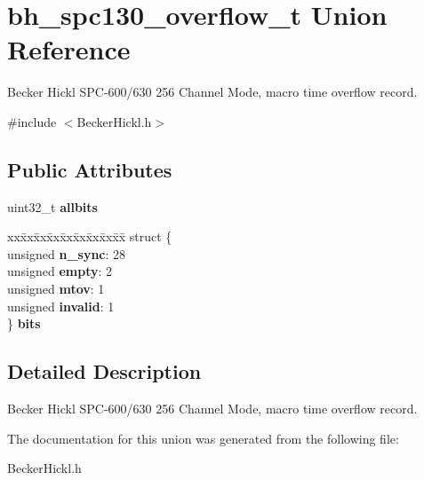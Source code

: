 \hypertarget{unionbh__spc130__overflow__t}{}\section{bh\+\_\+spc130\+\_\+overflow\+\_\+t Union Reference}
\label{unionbh__spc130__overflow__t}


Becker Hickl S\+P\+C-\/600/630 256 Channel Mode, macro time overflow record.  




{\ttfamily \#include $<$Becker\+Hickl.\+h$>$}

\subsection*{Public Attributes}
\begin{DoxyCompactItemize}
\item 
\mbox{\label{unionbh__spc130__overflow__t_aae580fff8ae8ac3f2bfb989756e66bf2}} 
uint32\+\_\+t {\bfseries allbits}
\item 
\mbox{\label{unionbh__spc130__overflow__t_a0a5c4c5c095a4a54ad15ed6bf6ca1eb1}} 
\begin{tabbing}
xx\=xx\=xx\=xx\=xx\=xx\=xx\=xx\=xx\=\kill
struct \{\\
\>unsigned {\bfseries n\_sync}: 28\\
\>unsigned {\bfseries empty}: 2\\
\>unsigned {\bfseries mtov}: 1\\
\>unsigned {\bfseries invalid}: 1\\
\} {\bfseries bits}\\

\end{tabbing}\end{DoxyCompactItemize}


\subsection{Detailed Description}
Becker Hickl S\+P\+C-\/600/630 256 Channel Mode, macro time overflow record. 

The documentation for this union was generated from the following file\+:\begin{DoxyCompactItemize}
\item 
Becker\+Hickl.\+h\end{DoxyCompactItemize}
